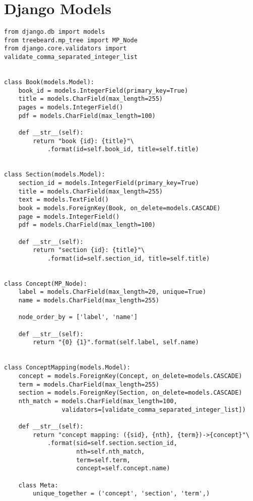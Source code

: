 \chapter{Django Models}
\label{appendix:models}

\begin{verbatim}
from django.db import models
from treebeard.mp_tree import MP_Node
from django.core.validators import validate_comma_separated_integer_list


class Book(models.Model):
    book_id = models.IntegerField(primary_key=True)
    title = models.CharField(max_length=255)
    pages = models.IntegerField()
    pdf = models.CharField(max_length=100)

    def __str__(self):
        return "book {id}: {title}"\
            .format(id=self.book_id, title=self.title)


class Section(models.Model):
    section_id = models.IntegerField(primary_key=True)
    title = models.CharField(max_length=255)
    text = models.TextField()
    book = models.ForeignKey(Book, on_delete=models.CASCADE)
    page = models.IntegerField()
    pdf = models.CharField(max_length=100)

    def __str__(self):
        return "section {id}: {title}"\
            .format(id=self.section_id, title=self.title)


class Concept(MP_Node):
    label = models.CharField(max_length=20, unique=True)
    name = models.CharField(max_length=255)

    node_order_by = ['label', 'name']

    def __str__(self):
        return "{0} {1}".format(self.label, self.name)


class ConceptMapping(models.Model):
    concept = models.ForeignKey(Concept, on_delete=models.CASCADE)
    term = models.CharField(max_length=255)
    section = models.ForeignKey(Section, on_delete=models.CASCADE)
    nth_match = models.CharField(max_length=100,
                validators=[validate_comma_separated_integer_list])

    def __str__(self):
        return "concept mapping: ({sid}, {nth}, {term})->{concept}"\
            .format(sid=self.section.section_id,
                    nth=self.nth_match,
                    term=self.term,
                    concept=self.concept.name)

    class Meta:
        unique_together = ('concept', 'section', 'term',)
\end{verbatim}